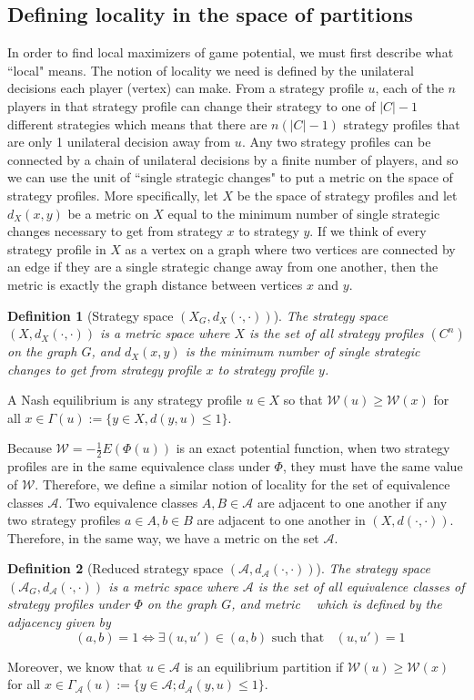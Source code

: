 \documentclass{article}
\newtheorem{definition}{Definition}[section]
\DeclareMathOperator{\dX}{d_{X}}
\DeclareMathOperator{\dA}{d_{\mathcal{A}}}
\begin{document}
    \subsection{Defining locality in the space of partitions}
    In order to find local maximizers of game potential, we must first describe what ``local" means. The notion of locality we need is defined by the unilateral decisions each player (vertex) can make. From a strategy profile $u$, each of the $n$ players in that strategy profile can change their strategy to one of $|C|-1$ different strategies which means that there are $n(|C|-1)$ strategy profiles that are only 1 unilateral decision away from $u$. Any two strategy profiles can be connected by a chain of unilateral decisions by a finite number of players, and so we can use the unit of ``single strategic changes" to put a metric on the space of strategy profiles. More specifically, let $X$ be the space of strategy profiles and let $d_X(x,y)$ be a metric on $X$ equal to the minimum number of single strategic changes necessary to get from strategy $x$ to strategy $y$. If we think of every strategy profile in $X$ as a vertex on a graph where two vertices are connected by an edge if they are a single strategic change away from one another, then the metric is exactly the graph distance between vertices $x$ and $y$. 
    \begin{definition}[Strategy space $(X_G,d_X(\cdot,\cdot))$]
        The strategy space $(X,d_X(\cdot,\cdot))$ is a metric space where $X$ is the set of all strategy profiles $(C^n)$ on the graph $G$, and $d_X(x,y)$ is the minimum number of single strategic changes to get from strategy profile $x$ to strategy profile $y$.
    \end{definition}
    A Nash equilibrium is any strategy profile $u\in X$ so that $\mathcal{W}(u)\geq\mathcal{W}(x)$ for all $x\in \Gamma(u):=\{y\in X,d(y,u)\leq 1\}$.

    Because $\mathcal{W}=-\frac{1}{2}E(\Phi(u))$ is an exact potential function, when two strategy profiles are in the same equivalence class under $\Phi$, they must have the same value of $\mathcal{W}$. Therefore, we define a similar notion of locality for the set of equivalence classes $\mathcal{A}$. Two equivalence classes $A,B\in \mathcal{A}$ are adjacent to one another if any two strategy profiles $a\in A, b\in B$ are adjacent to one another in $(X,d(\cdot,\cdot))$. Therefore, in the same way, we have a metric on the set $\mathcal{A}$. 
    \begin{definition}[Reduced strategy space $(\mathcal{A},d_\mathcal{A}(\cdot,\cdot))$]
        The strategy space $(\mathcal{A}_G,d_\mathcal{A}(\cdot,\cdot))$ is a metric space where $\mathcal{A}$ is the set of all equivalence classes of strategy profiles under $\Phi$ on the graph $G$, and metric $\dA$ which is defined by the adjacency given by \[\dA(a,b)=1\iff \exists (u,u')\in (a,b) \text{ such that }\dX(u,u')=1\]
    \end{definition}
    Moreover, we know that $u\in \mathcal{A}$ is an equilibrium partition if $\mathcal{W}(u)\geq\mathcal{W}(x)$ for all $x\in \Gamma_\mathcal{A}(u):=\{y\in \mathcal{A};d_{\mathcal{A}}(y,u)\leq 1\}.$ 
\end{document}
